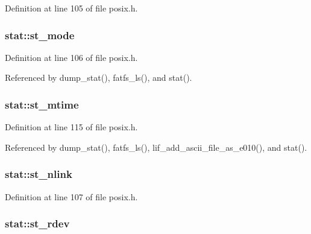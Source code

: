 Definition at line 105 of file posix.\+h.

\subsubsection[{\texorpdfstring{st\+\_\+mode}{st_mode}}]{ stat\+::st\+\_\+mode}\hypertarget{structstat_a5cbdd829011af82ba61e83773bbcbc7d}{}\label{structstat_a5cbdd829011af82ba61e83773bbcbc7d}


Definition at line 106 of file posix.\+h.



Referenced by dump\+\_\+stat(), fatfs\+\_\+ls(), and stat().

\subsubsection[{\texorpdfstring{st\+\_\+mtime}{st_mtime}}]{ stat\+::st\+\_\+mtime}\hypertarget{structstat_a77e235090f8cb6897f1c0ce65689006b}{}\label{structstat_a77e235090f8cb6897f1c0ce65689006b}


Definition at line 115 of file posix.\+h.



Referenced by dump\+\_\+stat(), fatfs\+\_\+ls(), lif\+\_\+add\+\_\+ascii\+\_\+file\+\_\+as\+\_\+e010(), and stat().

\subsubsection[{\texorpdfstring{st\+\_\+nlink}{st_nlink}}]{ stat\+::st\+\_\+nlink}\hypertarget{structstat_a0ed9092fa6c77a3251b9b9a4738ef84f}{}\label{structstat_a0ed9092fa6c77a3251b9b9a4738ef84f}


Definition at line 107 of file posix.\+h.

\subsubsection[{\texorpdfstring{st\+\_\+rdev}{st_rdev}}]{ stat\+::st\+\_\+rdev}\hypertarget{structstat_aa61e6c1a8a91c69f1d26f6700a0546cb}{}\label{structstat_aa61e6c1a8a91c69f1d26f6700a0546cb}


